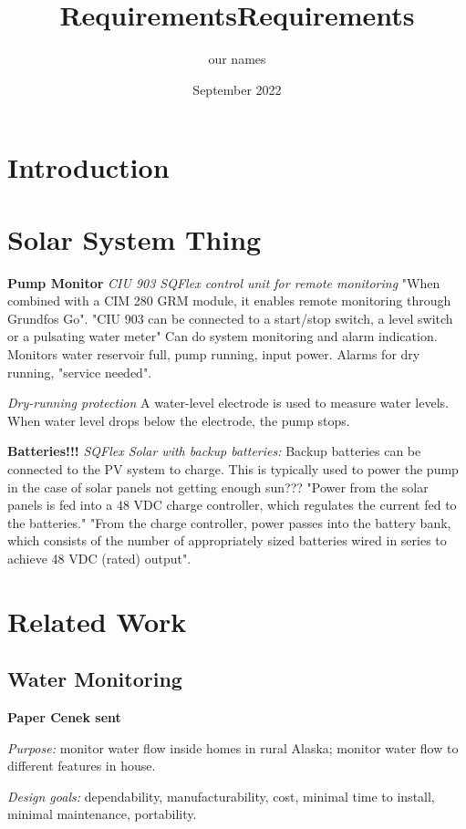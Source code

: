 \documentclass[12pt, letterpaper]{article}
\title{Requirements}
\author{our names}
\date{September 2022}
\begin{document}
\maketitle
\pagestyle{plain}

\title{Requirements}

\section{Introduction}

\section{Solar System Thing}
%
\textbf{Pump Monitor}
%
\textit{CIU 903 SQFlex control unit for remote monitoring}
%
"When combined with a CIM 280 GRM module, it enables remote monitoring through Grundfos Go".
%
"CIU 903 can be connected to a start/stop switch, a level switch or a pulsating water meter"
%
Can do system monitoring and alarm indication.
%
Monitors water reservoir full, pump running, input power.
%
Alarms for dry running, "service needed".

\textit{Dry-running protection}
%
A water-level electrode is used to measure water levels.
%
When water level drops below the electrode, the pump stops.

\textbf{Batteries!!!}
%
\textit{SQFlex Solar with backup batteries:} Backup batteries can be connected to the PV system
to charge.
%
This is typically used to power the pump in the case of solar panels not getting enough sun???
%
"Power from the solar panels is fed into a 48 VDC charge controller, which regulates the current fed to the batteries."
%
"From the charge controller, power passes into the battery bank, which consists of the number of
appropriately sized batteries wired in series to achieve 48 VDC (rated) output".


\section{Related Work}
\subsection{Water Monitoring}
\textbf{Paper Cenek sent}
%

\textit{Purpose:} monitor water flow inside homes in rural Alaska; monitor water flow to different features in house.
%

\textit{Design goals:} dependability, manufacturability, cost, minimal time to install, minimal maintenance, portability.
%
\end{document}
